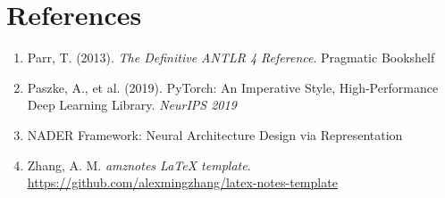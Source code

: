 \documentclass{nngraph-en}
\begin{document}
\chapter*{References}

\begin{enumerate}
    \item Parr, T. (2013). \textit{The Definitive ANTLR 4 Reference}. Pragmatic Bookshelf
    \item Paszke, A., et al. (2019). PyTorch: An Imperative Style, High-Performance Deep Learning Library. \textit{NeurIPS 2019}
    \item NADER Framework: Neural Architecture Design via Representation 
    \item Zhang, A. M. \textit{amznotes LaTeX template}. \url{https://github.com/alexmingzhang/latex-notes-template}
\end{enumerate}
\end{document}
